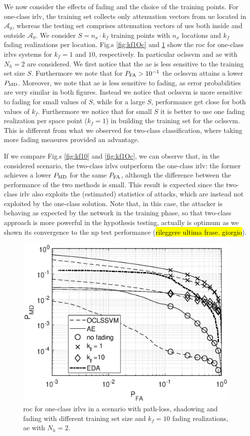 \documentclass[draftcls,onecolumn,12pt]{IEEEtran}
\begin{document}
We now consider the effects of fading and the choice of the training points. For one-class \ac{irlv}, the training set collects only attenuation vectors from \ac{ue} located in $\mathcal{A}_0$, whereas the testing set comprises attenuation vectors of \acp{ue} both inside and outside $\mathcal A_0$. We consider $S = n_x \cdot k_f$ training points with $n_x$ locations and $k_f$ fading realizations per location. Fig.s \ref{fig:kf1Oc} and \ref{fig:kf10Oc} show the \ac{roc} for one-class \acp{irlv} systems for $k_f = 1$ and $10$, respectively. In particular \ac{oclssvm} and  \ac{ae} with $N_h=2$ are considered.  We first notice that the \ac{ae} is less sensitive to the training set size $S$. Furthermore we note that for $P_{\rm FA} > 10^{-1}$ the \ac{oclssvm} attains a lower  $P_{\rm MD}$. Moreover, we note that \ac{ae} is less sensitive to fading, as error probabilities are very similar in both figures. Instead we notice that  \ac{oclssvm} is more sensitive to fading for small values of $S$, while for a large $S$, performance get close for both values of $k_f$. Furthermore we notice that for small $S$ it is better to use one fading realization per space point ($k_f=1$) in building the training set for the \ac{oclssvm}. This is different  from what we observed for two-class classification, where taking more fading measures provided an advantage.  

If we compare Fig.s \ref{fig:kf10} and \ref{fig:kf1Oc}, we can observe that, in the considered scenario, the two-class \acp{irlv} outperform the one-class \ac{irlv}: the former achieves a lower $P_{\rm MD}$ for the same $P_{\rm FA}$, although the difference between the performance of the two methods is small. This result is expected since the two-class \ac{irlv} also exploits the (estimated) statistics of attacks, which are instead not exploited by the one-class solution. Note that, in this case, the attacker is behaving as expected by the network in the training phase, so that two-class approach is more powerful in the hypothesis testing, actually is optimum  as we shown its convergence to the \ac{np} test performance (\hl{rileggere ultima frase. giorgio}).
 
 
 

\begin{figure}[t]
    \centering
    \includegraphics[width=0.6\columnwidth]{res_Fading_10BS_oneClass.eps}
    \caption{\ac{roc} for one-class \acp{irlv} in a scenario with path-loss, shadowing and fading with different training set size and $k_f=10$ fading realizations,  \ac{ae} with $N_h = 2$. }
    \label{fig:kf10Oc}
\end{figure}
\end{document}
